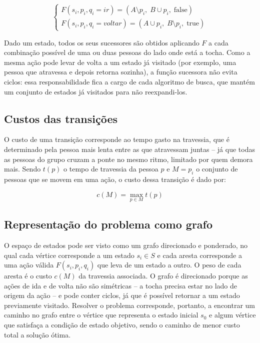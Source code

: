 \documentclass[12pt,a4paper]{article}
\begin{document}
\begin{equation}
\begin{cases}
F(s_i, p_i, q_i=\mathit{ir}) = (A \setminus p_i,\; B \cup p_i,\; \text{false})
\\
F(s_i, p_i, q_i=\mathit{voltar}) = (A \cup p_i,\; B \setminus p_i,\; \text{true})
\end{cases}
\end{equation}

Dado um estado, todos os seus sucessores são obtidos aplicando $F$ a cada
combinação possível de uma ou duas pessoas do lado onde está a tocha. Como a
mesma ação pode levar de volta a um estado já visitado (por exemplo, uma
pessoa que atravessa e depois retorna sozinha), a função sucessora não evita
ciclos: essa responsabilidade fica a cargo de cada algoritmo de busca, que
mantém um conjunto de estados já visitados para não reexpandi-los.

\subsection{Custos das transições}

O custo de uma transição corresponde ao tempo gasto na travessia, que é
determinado pela pessoa mais lenta entre as que atravessam juntas -- já que
todas as pessoas do grupo cruzam a ponte no mesmo ritmo, limitado por quem
demora mais. Sendo $t(p)$ o tempo de travessia da pessoa $p$ e $M = p_i$ o
conjunto de pessoas que se movem em uma ação, o custo dessa transição é dado
por:

\[
c(M) = \max_{p \in M} t(p)
\]

\subsection{Representação do problema como grafo}

O espaço de estados pode ser visto como um grafo direcionado e ponderado, no
qual cada vértice corresponde a um estado $s_i \in S$ e cada aresta
corresponde a uma ação válida $F(s_i, p_i, q_i)$ que leva de um estado a
outro. O peso de cada aresta é o custo $c(M)$ da travessia associada. O grafo
é direcionado porque as ações de ida e de volta não são simétricas -- a tocha
precisa estar no lado de origem da ação -- e pode conter ciclos, já que é
possível retornar a um estado previamente visitado. Resolver o problema
corresponde, portanto, a encontrar um caminho no grafo entre o vértice que
representa o estado inicial $s_0$ e algum vértice que satisfaça a condição de
estado objetivo, sendo o caminho de menor custo total a solução ótima.
\end{document}
